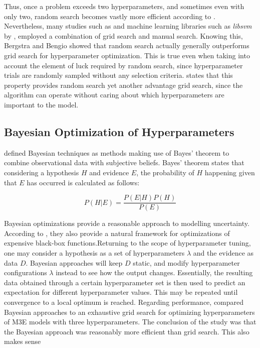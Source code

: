 Thus, once a problem exceeds two hyperparameters, and sometimes even with only two, random search becomes vastly more efficient according to \cite{Bergstra2012}. Nevertheless, many studies such as \cite{Duan2005,E.Hinton2010} and machine learning libraries such as \textit{libsvm} by \cite{Chang2011}, employed a combination of grid search and manual search. Knowing this, Bergstra and Bengio showed that random search actually generally outperforms grid search for hyperparameter optimization. This is true even when taking into account the element of luck required by random search, since hyperparameter trials are randomly sampled without any selection criteria. \cite{Snoek2012} states that this property provides random search yet another advantage grid search, since the algorithm can operate without caring about which hyperparameters are important to the model.


\subsection{Bayesian Optimization of Hyperparameters}
\label{sec:bayesian-optimization}
\cite{Press2005} defined Bayesian techniques as methods making use of Bayes' theorem to combine observational data with subjective beliefs.  Bayes' theorem states that considering a hypothesis $H$ and evidence $E$, the probability of $H$ happening given that $E$ has occurred is calculated as follows:

\[P(H|E) = \frac{P(E|H)P(H)}{P(E)}\]

Bayesian optimizations provide a reasonable approach to modelling uncertainty. According to \cite{Snoek2015}, they also provide a natural framework for optimizations of expensive black-box functions.Returning to the scope of hyperparameter tuning, one may consider a hypothesis as a set of hyperparameters $\lambda$ and the evidence as data $D$. Bayesian approaches will keep $D$ static, and modify hyperparameter configurations $\lambda$ instead to see how the output changes. Essentially, the resulting data obtained through a certain hyperparameter set is then used to predict an expectation for different hyperparameter values. This may be repeated until convergence to a local optimum is reached. Regarding performance, \cite{Snoek2012} compared Bayesian approaches to an exhaustive grid search for optimizing hyperparameters of M3E models with three hyperparameters. The conclusion of the study was that the Bayesian approach was reasonably more efficient than grid search. This also makes sense 

